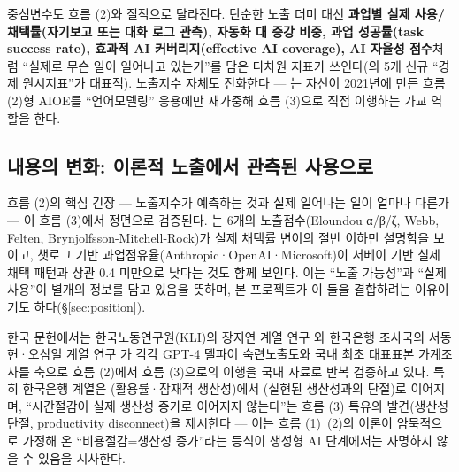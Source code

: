 \documentclass[11pt]{article}
\begin{document}
중심변수도 흐름 (2)와 질적으로 달라진다. 단순한 노출 더미 대신 \textbf{과업별 실제 사용/채택률(자기보고 또는 대화 로그 관측), 자동화 대 증강 비중, 과업 성공률(task success rate), 효과적 AI 커버리지(effective AI coverage), AI 자율성 점수}처럼 ``실제로 무슨 일이 일어나고 있는가''를 담은 다차원 지표가 쓰인다(\cite{appel-2026-economic-primitives}의 5개 신규 ``경제 원시지표''가 대표적). 노출지수 자체도 진화한다 — \textcite{felten-2023-how-will-language-modelers-like-chatgpt}는 자신이 2021년에 만든 흐름 (2)형 AIOE를 ``언어모델링'' 응용에만 재가중해 흐름 (3)으로 직접 이행하는 가교 역할을 한다.

\subsection{내용의 변화: 이론적 노출에서 관측된 사용으로}

흐름 (2)의 핵심 긴장 — 노출지수가 예측하는 것과 실제 일어나는 일이 얼마나 다른가 — 이 흐름 (3)에서 정면으로 검증된다. \textcite{bick-2026-what-work-does-generative}는 6개의 노출점수(Eloundou α/β/ζ, Webb, Felten, Brynjolfsson-Mitchell-Rock)가 실제 채택률 변이의 절반 이하만 설명함을 보이고, 챗로그 기반 과업점유율(Anthropic·OpenAI·Microsoft)이 서베이 기반 실제 채택 패턴과 상관 0.4 미만으로 낮다는 것도 함께 보인다. 이는 ``노출 가능성''과 ``실제 사용''이 별개의 정보를 담고 있음을 뜻하며, 본 프로젝트가 이 둘을 결합하려는 이유이기도 하다(\S\ref{sec:position}).

한국 문헌에서는 한국노동연구원(KLI)의 장지연 계열 연구 \parencite{chang-2024-ai-development-employment-effects,chang-2025-ai-era-skills,chang-2026-ai-technology-diffusion-employment,chang-2026-skill-network-ai-era}와 한국은행 조사국의 서동현·오삼일 계열 연구 \parencite{bok-2025-rapid-ai-diffusion-productivity-effects,bok-2026-ai-adoption-productivity-effects,han-2025-ai-diffusion-youth-employment-decline,bok-2026-youth-employment-decline-ai-career-ladder}가 각각 GPT-4 델파이 숙련노출도와 국내 최초 대표표본 가계조사를 축으로 흐름 (2)에서 흐름 (3)으로의 이행을 국내 자료로 반복 검증하고 있다. 특히 한국은행 계열은 \textcite{bok-2025-rapid-ai-diffusion-productivity-effects}(활용률·잠재적 생산성)에서 \textcite{bok-2026-ai-adoption-productivity-effects}(실현된 생산성과의 단절)로 이어지며, ``시간절감이 실제 생산성 증가로 이어지지 않는다''는 흐름 (3) 특유의 발견(생산성 단절, productivity disconnect)을 제시한다 — 이는 흐름 (1)~(2)의 이론이 암묵적으로 가정해 온 ``비용절감=생산성 증가''라는 등식이 생성형 AI 단계에서는 자명하지 않을 수 있음을 시사한다.

\end{document}

